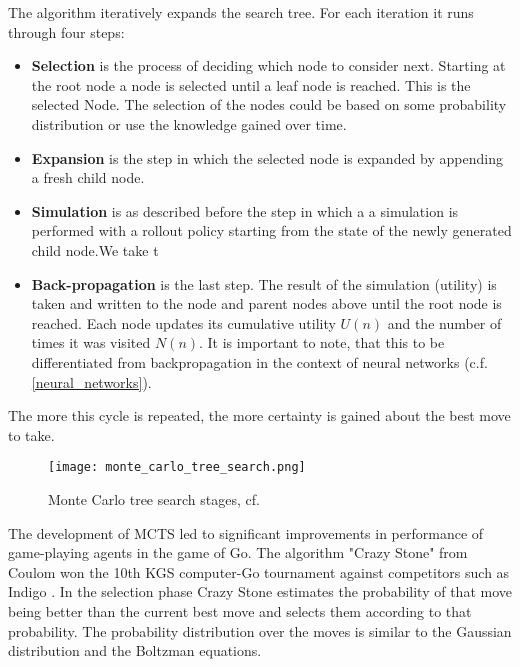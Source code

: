 The algorithm iteratively expands the search tree. For each iteration it runs through four steps:
\begin{itemize}
    \item \textbf{Selection} is the process of deciding which node to consider next. Starting at the root node a node is selected until a leaf node is reached. This is the selected Node. The selection of the nodes could be based on some probability distribution or use the knowledge gained over time.

    \item \textbf{Expansion} is the step in which the selected node is expanded by appending a fresh child node.

    \item \textbf{Simulation} is as described before the step in which a a simulation is performed with a rollout policy starting from the state of the newly generated child node.We take t

    \item \textbf{Back-propagation} is the last step. The result of the simulation (utility) is taken and written to the node and parent nodes above until the root node is reached. Each node updates its cumulative utility $U(n)$ and the number of times it was visited $N(n)$. It is important to note, that this to be differentiated from backpropagation in the context of neural networks (c.f. \ref{neural_networks}).
\end{itemize}

The more this cycle is repeated, the more certainty is gained about the best move to take.

\begin{figure}
    \centering
    \texttt{[image: monte\_carlo\_tree\_search.png]}
    \caption{Monte Carlo tree search stages, cf. \cite{noauthor_fig_nodate}}
    \label{monte_carlo_tree_search}
\end{figure}

The development of MCTS led to significant improvements in performance of game-playing agents in the game of Go. The algorithm "Crazy Stone" from Coulom won the 10th KGS computer-Go tournament against competitors such as Indigo \cite{bouzy_associating_2006}. In the selection phase Crazy Stone estimates the probability of that move being better than the current best move and selects them according to that probability. The probability distribution over the moves is similar to the Gaussian distribution and the Boltzman equations. \cite[p. 4]{coulom_efficient_2007}

